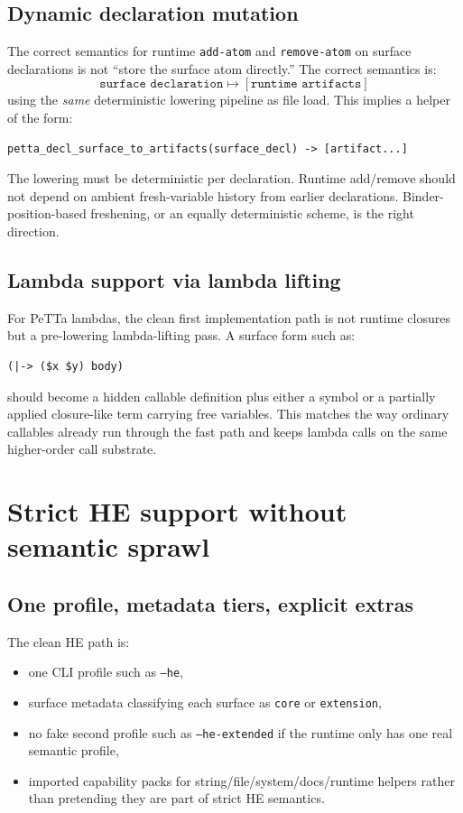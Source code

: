 \documentclass[11pt]{article}
\begin{document}
\subsection{Dynamic declaration mutation}

The correct semantics for runtime \texttt{add-atom} and \texttt{remove-atom} on surface declarations is not ``store the surface atom directly.'' The correct semantics is:
\[
\texttt{surface declaration} \mapsto [\texttt{runtime artifacts}]
\]
using the \emph{same} deterministic lowering pipeline as file load. This implies a helper of the form:
\begin{lstlisting}
petta_decl_surface_to_artifacts(surface_decl) -> [artifact...]
\end{lstlisting}

The lowering must be deterministic per declaration. Runtime add/remove should not depend on ambient fresh-variable history from earlier declarations. Binder-position-based freshening, or an equally deterministic scheme, is the right direction.

\subsection{Lambda support via lambda lifting}

For PeTTa lambdas, the clean first implementation path is not runtime closures but a pre-lowering lambda-lifting pass. A surface form such as:
\begin{lstlisting}
(|-> ($x $y) body)
\end{lstlisting}
should become a hidden callable definition plus either a symbol or a partially applied closure-like term carrying free variables. This matches the way ordinary callables already run through the fast path and keeps lambda calls on the same higher-order call substrate.

\section{Strict HE support without semantic sprawl}

\subsection{One profile, metadata tiers, explicit extras}

The clean HE path is:
\begin{itemize}
    \item one CLI profile such as \texttt{--he},
    \item surface metadata classifying each surface as \texttt{core} or \texttt{extension},
    \item no fake second profile such as \texttt{--he-extended} if the runtime only has one real semantic profile,
    \item imported capability packs for string/file/system/docs/runtime helpers rather than pretending they are part of strict HE semantics.
\end{itemize}
\end{document}
